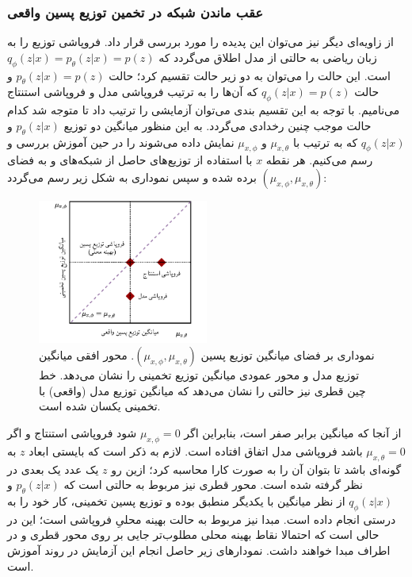 \subsubsection{عقب ماندن شبکه
	\encoder{}
	در تخمین توزیع پسین واقعی}
از زاویه‌ای دیگر نیز می‌توان این پدیده را مورد بررسی قرار داد. فروپاشی توزیع \posterior{} را به زبان ریاضی به حالتی از مدل اطلاق می‌گردد که
$q_\phi(z|x) = p_\theta (z|x) = p(z)$
است. این حالت را می‌توان به دو زیر حالت تقسیم کرد؛ حالت $p_\theta(z|x) = p(z)$ و حالت $q_\phi(z|x) = p(z)$ که آن‌ها را به ترتیب فروپاشی مدل و فروپاشی استنتاج می‌نامیم. با توجه به این تقسیم بندی می‌توان آزمایشی را ترتیب داد تا متوجه شد کدام حالت موجب چنین رخدادی می‌گردد. به این منظور میانگین دو توزیع $p_\theta(z|x)$ و $q_\phi(z|x)$ که به ترتیب با $\mu_{x,\theta}$ و $\mu_{x,\phi}$ نمایش داده می‌شوند را در حین آموزش بررسی و رسم می‌کنیم. هر نقطه $x$ با استفاده از توزیع‌های حاصل از شبکه‌های \encoder{} و \decoder{} به فضای
$(\mu_{x,\phi}, \mu_{x,\theta})$
برده شده و سپس نموداری به شکل زیر رسم می‌گردد:
\begin{figure}[H]
	\centering
	\includegraphics[width=0.5\textwidth]{images/lagging1.pdf}
	\caption{
		نموداری بر فضای میانگین توزیع پسین $(\mu_{x,\phi}, \mu_{x,\theta})$. محور افقی میانگین توزیع \posterior{} مدل و محور عمودی میانگین توزیع \posterior{} تخمینی را نشان می‌دهد. خط چین قطری نیز حالتی را نشان می‌دهد که میانگین توزیع \posterior{} مدل (واقعی) با تخمینی یکسان شده است.
	}
\end{figure}

از آنجا که میانگین \priordist{} برابر صفر است، بنابراین اگر $\mu_{x,\phi} = 0$ شود فروپاشی استنتاج و اگر $\mu_{x,\theta} = 0$ باشد فروپاشی مدل اتفاق افتاده است. لازم به ذکر است که بایستی ابعاد $z$ به گونه‌ای باشد تا بتوان آن را به صورت کارا محاسبه کرد؛ ازین رو $z$ یک عدد یک بعدی در نظر گرفته شده است. محور قطری نیز مربوط به حالتی است که $p_\theta(z|x)$ و $q_\phi(z|x)$ از نظر میانگین با یکدیگر منطبق بوده و توزیع پسین تخمینی، کار خود را به درستی انجام داده است. مبدا نیز مربوط به حالت بهینه محلیِ فروپاشی \posteriordist{} است؛ این در حالی است که احتمالا نقاط بهینه محلی مطلوب‌تر جایی بر روی محور قطری و در اطراف مبدا خواهند داشت.
نمودار‌های زیر حاصل انجام این آزمایش در روند آموزش است.

